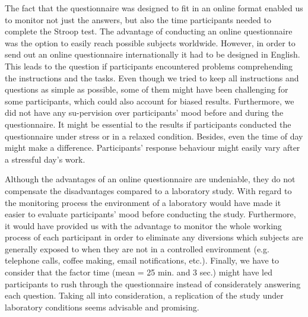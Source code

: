 The fact that the questionnaire was designed to fit in an online format enabled us to monitor not just the answers, but also the time participants needed to complete the Stroop test. The advantage of conducting an online questionnaire was the option to easily reach possible subjects worldwide. However, in order to send out an online questionnaire internationally it had to be designed in English. This leads to the question if participants encountered problems comprehending the instructions and the tasks. Even though we tried to keep all instructions and questions as simple as possible, some of them might have been challenging for some participants, which could also account for biased results. Furthermore, we did not have any su-pervision over participants’ mood before and during the questionnaire. It might be essential to the results if participants conducted the questionnaire under stress or in a relaxed condition. Besides, even the time of day might make a difference. Participants’ response behaviour might easily vary after a stressful day’s work.\par
Although the advantages of an online questionnaire are undeniable, they do not compensate the disadvantages compared to a laboratory study. With regard to the monitoring process the environment of a laboratory would have made it easier to evaluate participants’ mood before conducting the study. Furthermore, it would have provided us with the advantage to monitor the whole working process of each participant in order to eliminate any diversions which subjects are generally exposed to when they are not in a controlled environment (e.g. telephone calls, coffee making, email notifications, etc.). Finally, we have to consider that the factor time (mean = 25 min. and 3 sec.) might have led participants to rush through the questionnaire instead of considerately answering each question. Taking all into consideration, a replication of the study under laboratory conditions seems advisable and promising. \par
